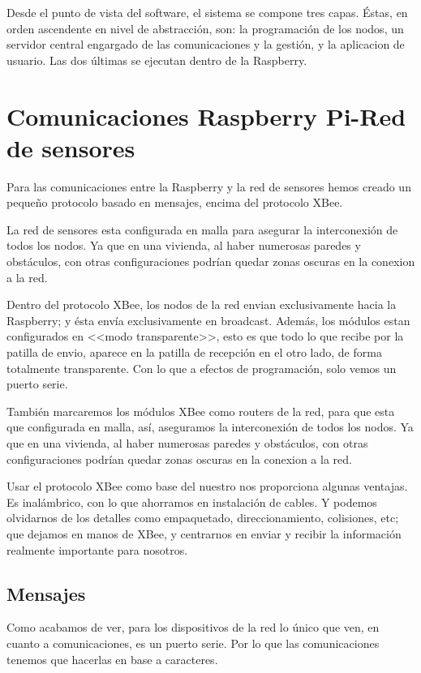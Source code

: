 Desde el punto de vista del software, el sistema se compone tres capas. Éstas, en orden ascendente en nivel de abstracción, son: la programación de los nodos, un servidor central engargado de las comunicaciones y la gestión, y la aplicacion de usuario. Las dos últimas se ejecutan dentro de la Raspberry.

\section{Comunicaciones Raspberry Pi-Red de sensores}
Para las comunicaciones entre la Raspberry y la red de sensores hemos creado un pequeño protocolo basado en mensajes, encima del protocolo XBee. 

La red de sensores esta configurada en  malla para asegurar la interconexión de todos los nodos. Ya que en una vivienda, al haber numerosas paredes y obstáculos, con otras configuraciones podrían quedar zonas oscuras en la conexion a la red.

Dentro del protocolo XBee, los nodos de la red envian exclusivamente hacia la Raspberry; y ésta envía exclusivamente en broadcast. Además, los módulos estan configurados en <<modo transparente>>, esto es que todo lo que recibe por la patilla de envio, aparece en la patilla de recepción en el otro lado, de forma totalmente transparente. Con lo que a efectos de programación, solo vemos un puerto serie. 

También marcaremos los módulos XBee como routers de la red, para que esta que configurada en malla, así, aseguramos la interconexión de todos los nodos. Ya que en una vivienda, al haber numerosas paredes y obstáculos, con otras configuraciones podrían quedar zonas oscuras en la conexion a la red.


Usar el protocolo XBee como base del nuestro nos proporciona algunas ventajas. Es inalámbrico, con lo que ahorramos en instalación de cables. Y podemos olvidarnos de los detalles como empaquetado, direccionamiento, colisiones, etc; que dejamos en manos de XBee, y centrarnos en enviar y recibir la información realmente importante para nosotros.

\subsection{Mensajes}
Como acabamos de ver, para los dispositivos de la red lo único que ven, en cuanto a comunicaciones,  es un puerto serie. Por lo que las comunicaciones tenemos que hacerlas en base a caracteres. 
 

